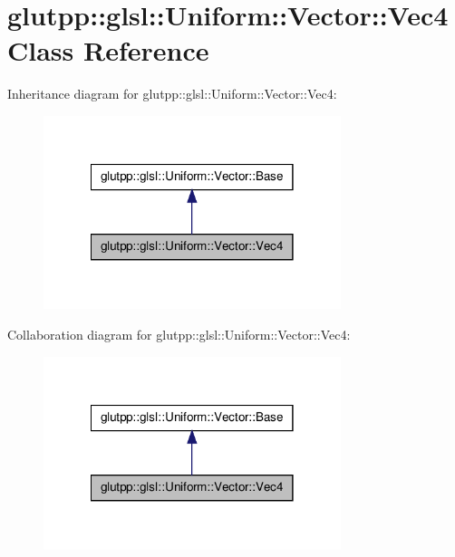 \hypertarget{classglutpp_1_1glsl_1_1Uniform_1_1Vector_1_1Vec4}{\section{glutpp\-:\-:glsl\-:\-:\-Uniform\-:\-:\-Vector\-:\-:\-Vec4 \-Class \-Reference}
\label{classglutpp_1_1glsl_1_1Uniform_1_1Vector_1_1Vec4}
}


\-Inheritance diagram for glutpp\-:\-:glsl\-:\-:\-Uniform\-:\-:\-Vector\-:\-:\-Vec4\-:\nopagebreak
\begin{figure}[H]
\begin{center}
\leavevmode
\includegraphics[width=246pt]{classglutpp_1_1glsl_1_1Uniform_1_1Vector_1_1Vec4__inherit__graph}
\end{center}
\end{figure}


\-Collaboration diagram for glutpp\-:\-:glsl\-:\-:\-Uniform\-:\-:\-Vector\-:\-:\-Vec4\-:\nopagebreak
\begin{figure}[H]
\begin{center}
\leavevmode
\includegraphics[width=246pt]{classglutpp_1_1glsl_1_1Uniform_1_1Vector_1_1Vec4__coll__graph}
\end{center}
\end{figure}
